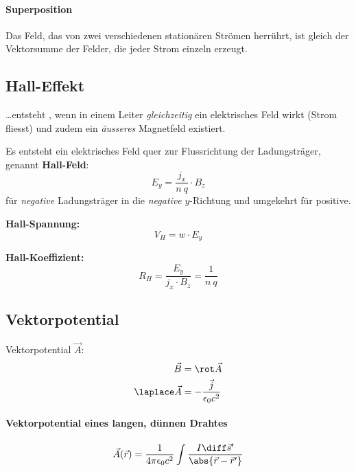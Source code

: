 		\paragraph{Superposition} %
			Das Feld, das von zwei verschiedenen stationären Strömen herrührt, ist gleich der Vektorsumme der Felder, die jeder Strom einzeln erzeugt.
		
	\subsection{Hall-Effekt} %
		…entsteht , wenn in einem Leiter \emph{gleichzeitig} ein elektrisches Feld wirkt (Strom fliesst) und zudem ein \emph{äusseres} Magnetfeld existiert.
		
		Es entsteht ein elektrisches Feld quer zur Flussrichtung der Ladungsträger, genannt \textbf{Hall-Feld}:
		\begin{equation*}
			E_y = \frac{j_x}{n\:q} \cdot B_z
		\end{equation*}
		für \emph{negative} Ladungsträger in die \emph{negative} $y$-Richtung und umgekehrt für positive.
		
		\textbf{Hall-Spannung:}
		\begin{equation*}
			V_H = w \cdot E_y
		\end{equation*}
		
		\textbf{Hall-Koeffizient:}
		\begin{equation*}
			R_H = \frac{E_y}{j_x \cdot B_z} = \frac{1}{n\:q}
		\end{equation*}
	\subsection{Vektorpotential} %
		Vektorpotential $\vec A$:
		\begin{align*}
			\vec B &= \rot \vec A \\
			\laplace \vec A &= -\frac{\vec j}{\epsilon_0 c^2}
		\end{align*}
		
		\paragraph{Vektorpotential eines langen, dünnen Drahtes} %
			\begin{equation*}
				\vec A(\vec r) = \frac{1}{4\pi\epsilon_0 c^2} \int \frac{I \diff \vec s'}{\abs{\vec r - \vec r'}}
			\end{equation*}
